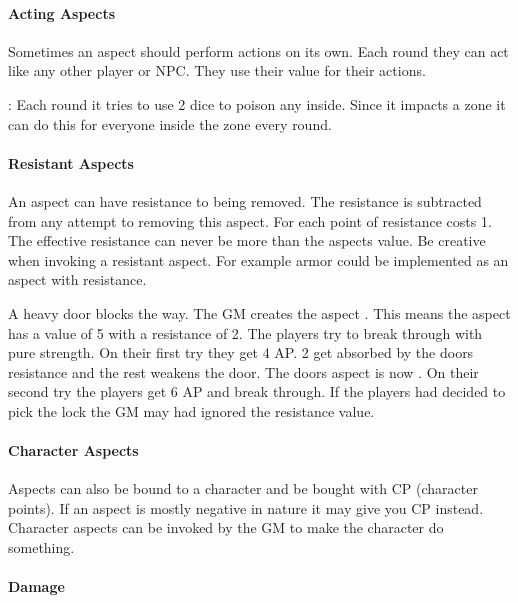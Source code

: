 \documentclass[11pt]{article}
\begin{document}
{\paragraph*{Acting Aspects}
\label{sec:orgec6031a}

Sometimes an aspect should perform actions on its own. Each round they can act like any other player or NPC. They use their value for their actions.

\begin{pwexample}
: Each round it tries to use 2 dice to poison any inside. Since it impacts a zone it can do this for everyone inside the zone every round.
\end{pwexample}

\paragraph*{Resistant Aspects}
\label{sec:org126c678}
An aspect can have resistance to being removed. The resistance is subtracted from any attempt to removing this aspect. For each point of resistance costs 1. The effective resistance can never be more than the aspects value. Be creative when invoking a resistant aspect. For example armor could be implemented as an aspect with resistance.

\begin{pwexample}
A heavy door blocks the way. The GM creates the aspect . This means the aspect has a value of 5 with a resistance of 2. The players try to break through with pure strength. On their first try they get 4 AP. 2 get absorbed by the doors resistance and the rest weakens the door. The doors aspect is now . On their second try the players get 6 AP and break through.
If the players had decided to pick the lock the GM may had ignored the resistance value.
\end{pwexample}


\paragraph*{Character Aspects}
\label{sec:org52b1e7a}

Aspects can also be bound to a character and be bought with CP (character points). If an aspect is mostly negative in nature it may give you CP instead. Character aspects can be invoked by the GM to make the character do something. 

\paragraph*{Damage}
\label{sec:org58a6403}

}
\end{document}
